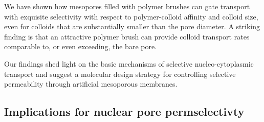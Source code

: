 \documentclass[12pt, a4paper]{article}
\newcommand\todo[1]{\textcolor{red}{#1}}
\begin{document}
We have shown how mesopores filled with polymer brushes can gate transport with exquisite selectivity with respect to polymer-colloid affinity and colloid size, even for colloids that are substantially smaller than the pore diameter.
A striking finding is that an attractive polymer brush can provide colloid transport rates comparable to, or even exceeding, the bare pore.

Our findings shed light on the basic mechanisms of selective nucleo-cytoplasmic transport and suggest a molecular design strategy for controlling selective permeability through artificial mesoporous membranes.


\subsection{Implications for nuclear pore permselectivty}

\end{document}
